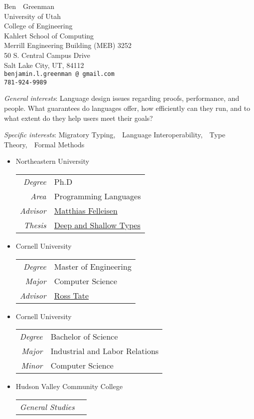 \documentclass[11pt]{article}
\makeatletter
\renewcommand{\maketitle}{
\begin{center}
  {\large{Ben~~Greenman}}
  \\ University of Utah
  \\ College of Engineering
  \\ Kahlert School of Computing
  \\ Merrill Engineering Building (MEB) 3252
  \\ 50 S. Central Campus Drive
  \\ Salt Lake City, UT, 84112
\vspace{0.1cm}
\\\texttt{\footnotesize benjamin.l.greenman\,@\,gmail.com}
\\\texttt{\footnotesize 781-924-9989}
\end{center}
}
\makeatother
\begin{document}
\maketitle


\newcommand{\interestpar}[2]{\noindent\emph{#1}\/: #2}
\newcommand{\isep}{,~~}

\interestpar{General interests}{
Language design
issues regarding
proofs, performance, and people.
What guarantees do languages offer,
how efficiently can they run,
and to what extent do they help users meet their goals?
}

\interestpar{Specific interests}{Migratory Typing\isep{}Language Interoperability\isep{}Type Theory\isep{}Formal Methods}


\begin{itemize}
\item {Northeastern University} \hfill {}\\
\begin{tabular}{>{\it}r l}
Degree & Ph.D \\
Area & Programming Languages \\
Advisor & \href{http://ccs.neu.edu/home/matthias}{Matthias Felleisen} \\
Thesis & \href{http://ccs.neu.edu/home/types/resources/pdf/g-dissertation-2020.pdf}{Deep and Shallow Types}
\end{tabular}

\item {Cornell University} \hfill {}\\
\begin{tabular}{>{\it}r l}
Degree & Master of Engineering\\
Major & Computer Science\\
Advisor & \href{http://www.cs.cornell.edu/~ross/}{Ross Tate}
\end{tabular}

\item {Cornell University} \hfill {}\\
\begin{tabular}{>{\it}r l}
Degree & Bachelor of Science\\
Major & Industrial and Labor Relations\\
Minor & Computer Science\\
\end{tabular}

\item {Hudson Valley Community College} \hfill {}\\
\begin{tabular}{>{\it}r l}
General Studies & \\
\end{tabular}
\end{itemize}
\end{document}
